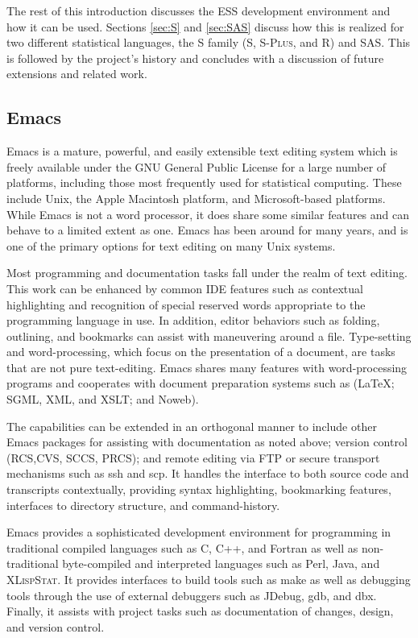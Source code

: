 \documentclass{article}
\newcommand*{\Splus}{\textsc{S-Plus}}
\newcommand*{\XLispStat}{\textsc{XLispStat}}
\begin{document}
The rest of this introduction discusses the ESS development
environment and how it can be used.  Sections \ref{sec:S} and
\ref{sec:SAS} discuss how this is realized for two different
statistical languages, the S family (S, \Splus, and R)
and SAS.  This is followed by the project's history and concludes
with a discussion of future extensions and related work.

\subsection{Emacs}
\label{sec:intro:emacs}

Emacs \citep{RMS:2000} is a mature, powerful, and easily extensible
text editing system which is freely available under the GNU General
Public License for a large number of platforms, including those most
frequently used for statistical computing.  These include Unix, the
Apple Macintosh platform, and Microsoft-based platforms.  While Emacs
is not a word processor, it does share some similar features and can
behave to a limited extent as one.  Emacs has been around for many
years, and is one of the primary options for text editing on many Unix
systems.

Most programming and documentation tasks fall under the realm of text
editing.  This work can be enhanced by common IDE features such as
contextual highlighting and recognition of special reserved words
appropriate to the programming language in use.  In addition, editor
behaviors such as folding, outlining, and bookmarks can assist with
maneuvering around a file.  Type-setting and word-processing, which
focus on the presentation of a document, are tasks that are not pure
text-editing.  Emacs shares many features with word-processing
programs and cooperates with document preparation systems such as
(\LaTeX; SGML, XML, and XSLT; and Noweb).

The capabilities can be extended in an orthogonal manner to include
other Emacs packages for assisting with documentation as noted above;
version control (RCS,CVS, SCCS, PRCS); and remote editing via FTP or
secure transport mechanisms such as ssh and scp.  It handles the
interface to both source code and transcripts contextually, providing
syntax highlighting, bookmarking features, interfaces to directory
structure, and command-history.

Emacs provides a sophisticated development environment for programming
in traditional compiled languages such as C, C++, and Fortran as well
as non-traditional byte-compiled and interpreted languages such as
Perl, Java, and \XLispStat.  It provides interfaces to build tools such as
make as well as debugging tools through the use of external debuggers
such as JDebug, gdb, and dbx.  Finally, it assists with project tasks
such as documentation of changes, design, and version control.
\end{document}
